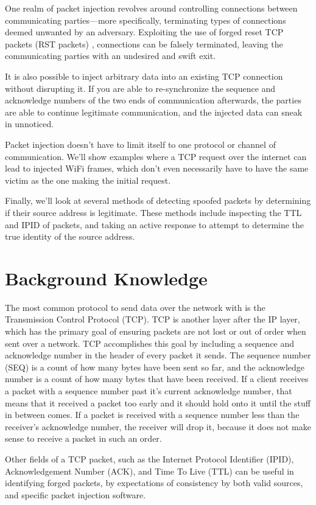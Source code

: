 \documentclass[journal]{IEEEtran}
\begin{document}
One realm of packet injection revolves around controlling connections between communicating parties---more specifically, terminating types of connections deemed unwanted by an adversary. Exploiting the use of forged reset TCP packets (RST packets) , connections can be falsely terminated, leaving the communicating parties with an undesired and swift exit. 

It is also possible to inject arbitrary data into an existing TCP connection without disrupting it. If you are able to re-synchronize the sequence and acknowledge numbers of the two ends of communication afterwards, the parties are able to continue legitimate communication, and the injected data can sneak in unnoticed.

Packet injection doesn't have to limit itself to one protocol or channel of communication. We'll show examples where a TCP request over the internet can lead to injected WiFi frames, which don't even necessarily have to have the same victim as the one making the initial request.

Finally, we'll look at several methods of detecting spoofed packets by determining if their source address is legitimate. These methods include inspecting the TTL and IPID of packets, and taking an active response to attempt to determine the true identity of the source address.

\section{Background Knowledge}

The most common protocol to send data over the network with is the Transmission Control Protocol (TCP). TCP is another layer after the IP layer, which has the primary goal of ensuring packets are not lost or out of order when sent over a network. TCP accomplishes this goal by including a sequence and acknowledge number in the header of every packet it sends. The sequence number (SEQ) is a count of how many bytes have been sent so far, and the acknowledge number is a count of how many bytes that have been received. If a client receives a packet with a sequence number past it's current acknowledge number, that means that it received a packet too early and it should hold onto it until the stuff in between comes. If a packet is received with a sequence number less than the receiver's acknowledge number, the receiver will drop it, because it does not make sense to receive a packet in such an order. 

Other fields of a TCP packet, such as the Internet Protocol Identifier (IPID), Acknowledgement Number (ACK), and Time To Live (TTL) can be useful in identifying forged packets, by expectations of consistency by both valid sources, and specific packet injection software. 
\end{document}
